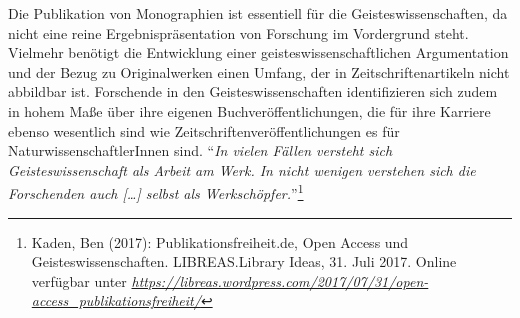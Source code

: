 \documentclass[a4paper,
fontsize=11pt,
oneside,
numbers=noperiodatend,
parskip=half-,
bibliography=totoc,
final
]{scrartcl}
\begin{document}
Die Publikation von Monographien ist essentiell für die
Geisteswissenschaften, da nicht eine reine Ergebnispräsentation von
Forschung im Vordergrund steht. Vielmehr benötigt die Entwicklung einer
geisteswissenschaftlichen Argumentation und der Bezug zu Originalwerken
einen Umfang, der in Zeitschriftenartikeln nicht abbildbar ist.
Forschende in den Geisteswissenschaften identifizieren sich zudem in
hohem Maße über ihre eigenen Buchveröffentlichungen, die für ihre
Karriere ebenso wesentlich sind wie Zeitschriftenveröffentlichungen es
für NaturwissenschaftlerInnen sind. \enquote{\emph{In vielen Fällen
versteht sich Geisteswissenschaft als Arbeit am Werk. In nicht wenigen
verstehen sich die Forschenden auch {[}\ldots{}{]} selbst als
Werkschöpfer.}}\footnote{Kaden, Ben (2017): Publikationsfreiheit.de,
  Open Access und Geisteswissenschaften. LIBREAS.Library Ideas, 31. Juli
  2017. Online verfügbar unter
  \href{https://libreas.wordpress.com/2017/07/31/open-access_publikationsfreiheit/}{\emph{https://libreas.wordpress.com/2017/07/31/open-access\_publikationsfreiheit/}}}
\end{document}
